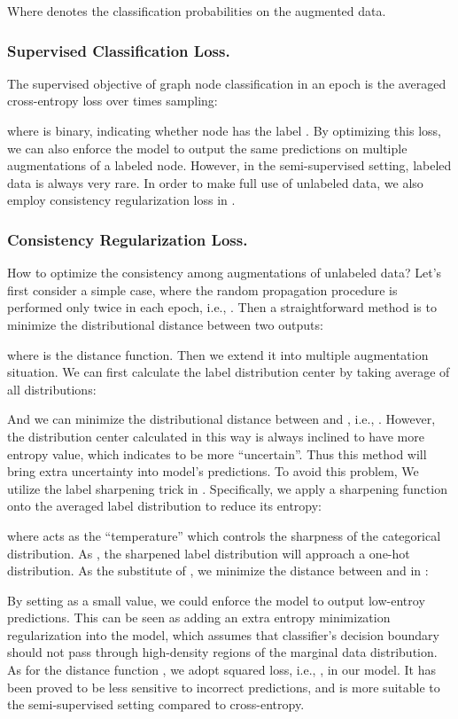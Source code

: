 {Where  denotes the classification probabilities on the  augmented data. 
\subsubsection{Supervised Classification Loss.}
The supervised objective of graph node classification in an epoch is the averaged cross-entropy loss over  times sampling:


\noindent where  is binary, indicating whether node  has the label . By optimizing this loss, we can also enforce the model to output the same predictions on multiple augmentations of a labeled node.
 However, in the semi-supervised setting, labeled data is always very rare. In order to make full use of unlabeled data, we also employ consistency regularization loss in \model. 
 
\subsubsection{Consistency Regularization Loss.} How to optimize the consistency among  augmentations of unlabeled data? 
 Let's first consider a simple case, where the random propagation procedure is performed only twice in each epoch, i.e., . Then a straightforward method is to minimize the distributional distance between two outputs:
 
where  is the distance function. Then we extend it into multiple augmentation situation. We can first calculate the label distribution center by taking average of all distributions:


And we can minimize the distributional distance between  and , i.e., .
\hide{

}
However, the distribution center calculated in this way is always inclined to have more entropy value, which indicates to be more ``uncertain''. 
Thus this method will bring extra uncertainty into model's predictions. To avoid this problem, We utilize the label sharpening trick in \model. Specifically, we apply a sharpening function onto the averaged label distribution to reduce its entropy:

where  acts as the ``temperature'' which controls the sharpness of the categorical distribution. As , the sharpened label distribution will approach a one-hot distribution. As the substitute of , we minimize the distance between   and  in \model:


By setting  as a small value, we could enforce the model to output low-entroy predictions. This can be seen as adding an extra entropy minimization regularization into the model, which assumes that classifier's decision boundary should not pass through high-density regions of the marginal data distribution\cite{grandvalet2005semi}. As for the  distance function , we adopt squared  loss, i.e., , in our model. It has been proved to be less sensitive to incorrect predictions\cite{berthelot2019mixmatch}, and is more suitable to the semi-supervised setting compared to cross-entropy. 



}
